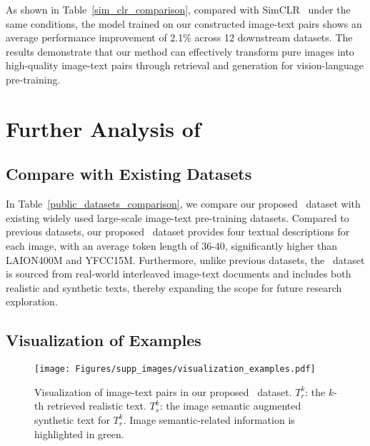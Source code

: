As shown in Table~\ref{sim_clr_comparison}, compared with SimCLR~\cite{chen2020simple} under the same conditions, the model trained on our constructed image-text pairs shows an average performance improvement of 2.1\% across 12 downstream datasets. The results demonstrate that our method can effectively transform pure images into high-quality image-text pairs through retrieval and generation for vision-language pre-training.



\section{Further Analysis of \dsname}
\label{sec: further analysis of data}

\subsection{Compare with Existing Datasets}
In Table~\ref{public_datasets_comparison}, we compare our proposed \dsname \ dataset with existing widely used large-scale image-text pre-training datasets. Compared to previous datasets, our proposed \dsname\ dataset provides four textual descriptions for each image, with an average token length of 36-40, significantly higher than LAION400M and YFCC15M. Furthermore, unlike previous datasets, the \dsname\ dataset is sourced from real-world interleaved image-text documents and includes both realistic and synthetic texts, thereby expanding the scope for future research exploration.

\subsection{Visualization of Examples}

\begin{figure*}[t]
    \centering
    \texttt{[image: Figures/supp\_images/visualization\_examples.pdf]}
    \vspace{-8mm}
    \caption{Visualization of image-text pairs in our proposed \dsname\ dataset. $T^{k}_{r}$: the $k$-th retrieved realistic text. $T^{k}_{s}$: the image semantic augmented synthetic text for $T^{k}_{r}$. Image semantic-related information is highlighted in \textcolor{fig2_green}{green}.}
    \label{visualization_example1}
\end{figure*}

